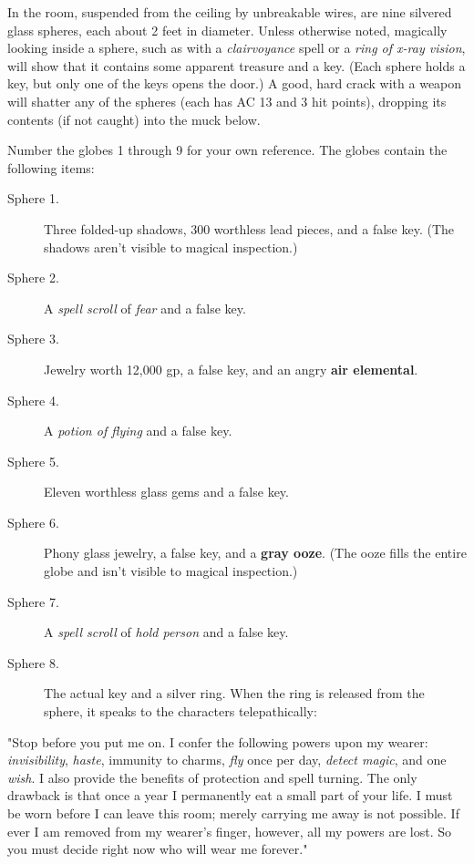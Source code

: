 \documentclass[10pt,a4paper,twoside,bg=print,twocolumn,openany,nodeprecatedcode]{dndbook}
\begin{document}
In the room, suspended from the ceiling by unbreakable wires, are nine silvered glass spheres, each about 2 feet in diameter. Unless otherwise noted, magically looking inside a sphere, such as with a \textit{clairvoyance} spell or a \textit{ring of x-ray vision}, will show that it contains some apparent treasure and a key. (Each sphere holds a key, but only one of the keys opens the door.) A good, hard crack with a weapon will shatter any of the spheres (each has AC 13 and 3 hit points), dropping its contents (if not caught) into the muck below.

Number the globes 1 through 9 for your own reference. The globes contain the following items:


\begin{description}
\item[Sphere 1.]
Three folded-up shadows, 300 worthless lead pieces, and a false key. (The shadows aren't visible to magical inspection.)
\item[Sphere 2.]
A \textit{spell scroll} of \textit{fear} and a false key.
\item[Sphere 3.]
Jewelry worth 12,000 gp, a false key, and an angry \textbf{air elemental}.
\item[Sphere 4.]
A \textit{potion of flying} and a false key.
\item[Sphere 5.]
Eleven worthless glass gems and a false key.
\item[Sphere 6.]
Phony glass jewelry, a false key, and a \textbf{gray ooze}. (The ooze fills the entire globe and isn't visible to magical inspection.)
\item[Sphere 7.]
A \textit{spell scroll} of \textit{hold person} and a false key.
\item[Sphere 8.]
The actual key and a silver ring. When the ring is released from the sphere, it speaks to the characters telepathically:
\end{description}

\begin{DndReadAloud}{}
"Stop before you put me on. I confer the following powers upon my wearer: \textit{invisibility}, \textit{haste}, immunity to charms, \textit{fly} once per day, \textit{detect magic}, and one \textit{wish}. I also provide the benefits of protection and spell turning. The only drawback is that once a year I permanently eat a small part of your life. I must be worn before I can leave this room; merely carrying me away is not possible. If ever I am removed from my wearer's finger, however, all my powers are lost. So you must decide right now who will wear me forever."

\end{DndReadAloud}
\end{document}

